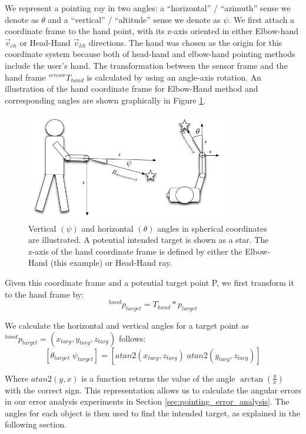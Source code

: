 \documentclass[12pt]{gatech-thesis}
\begin{document}
We represent a pointing ray in two angles: a ``horizontal'' / ``azimuth'' sense we denote as $\theta$ and a ``vertical'' / ``altitude'' sense we denote as $\psi$. We first attach a coordinate frame to the hand point, with its z-axis oriented in either Elbow-hand $\vec{v}_{eh}$ or Head-Hand $\vec{v}_{hh}$ directions. The hand was chosen as the origin for this coordinate system because both of head-hand and elbow-hand pointing methods include the user's hand. The transformation between the sensor frame and the hand frame $^{sensor}T_{hand}$ is calculated by using an angle-axis rotation. An illustration of the hand coordinate frame for Elbow-Hand method and corresponding angles are shown graphically in Figure \ref{fig:pointing_angle_errors}.

\begin{figure}[ht!]
\centering
\includegraphics[width=0.8\textwidth]{pics/person_angles_combined_2.png}
\caption{Vertical $(\psi)$ and horizontal $(\theta)$ angles in spherical coordinates are illustrated. A potential intended target is shown as a star. The z-axis of the hand coordinate frame is defined by either the Elbow-Hand (this example) or Head-Hand ray.}
\label{fig:pointing_angle_errors}
\end{figure}

Given this coordinate frame and a potential target point P, we first transform it to the hand frame by:
$$^{hand}p_{target} = T_{hand} * p_{target}$$

We calculate the horizontal and vertical angles for a target point as $^{hand}p_{target} = (x_{targ}, y_{targ}, z_{targ})$ follows:
$$[\theta_{target}\;\psi_{target}]=[atan2(x_{targ}, z_{targ})\;atan2(y_{targ}, z_{targ})]$$

Where $atan2(y,x)$ is a function returns the value of the angle $\arctan(\frac{y}{x})$ with the correct sign. This representation allows us to calculate the angular errors in our error analysis experiments in Section \ref{sec:pointing_error_analysis}. The angles for each object is then used to find the intended target, as explained in the following section.
\end{document}
